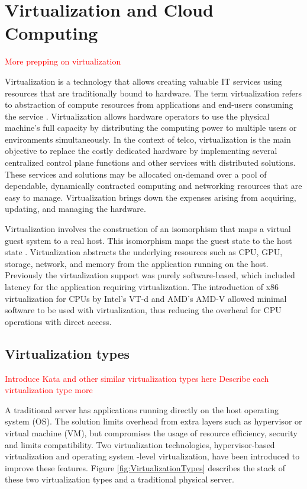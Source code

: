 \chapter{Virtualization and Cloud Computing}
\label{chapter:cloudcomputing}

\textcolor{red}{More prepping on virtualization}

Virtualization is a technology that allows creating valuable IT services using resources that are traditionally bound to hardware. The term virtualization refers to abstraction of compute resources from applications and end-users consuming the service \cite{Xing2012}. Virtualization allows hardware operators to use the physical machine's full capacity by distributing the computing power to multiple users or environments simultaneously. \cite{RedHat} In the context of telco, virtualization is the main objective to replace the costly dedicated hardware by implementing several centralized control plane functions and other services with distributed solutions. These services and solutions may be allocated on-demand over a pool of dependable, dynamically contracted computing and networking resources that are easy to manage. \cite{Bosch2011} Virtualization brings down the expenses arising from acquiring, updating, and managing the hardware.

Virtualization involves the construction of an isomorphism that maps a virtual guest system to a real host. This isomorphism maps the guest state to the host state \cite{Xing2012}. Virtualization abstracts the underlying resources such as CPU, GPU, storage, network, and memory from the application running on the host. Previously the virtualization support was purely software-based, which included latency for the application requiring virtualization. The introduction of x86 virtualization for CPUs by Intel's VT-d and AMD's AMD-V allowed minimal software to be used with virtualization, thus reducing the overhead for CPU operations with direct access. 

\section{Virtualization types}
\textcolor{red}{Introduce Kata and other similar virtualization types here}
\textcolor{red}{Describe each virtualization type more}

A traditional server has applications running directly on the host operating system (OS). The solution limits overhead from extra layers such as hypervisor or virtual machine (VM), but compromises the usage of resource efficiency, security and limits compatibility. Two virtualization technologies, hypervisor-based virtualization and operating system -level virtualization, have been introduced to improve these features. Figure \ref{fig:VirtualizationTypes} describes the stack of these two virtualization types and a traditional physical server.

